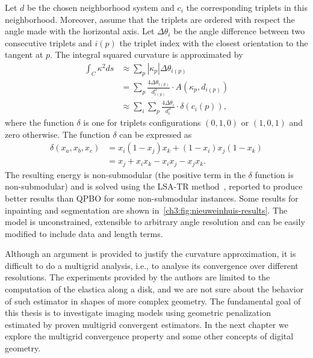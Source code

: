 Let $d$ be the chosen neighborhood system and $c_i$ the corresponding triplets in this neighborhood. Moreover, assume that the triplets are ordered with respect the angle made with the horizontal axis. Let $\Delta \theta_i$ be the angle difference between two consecutive triplets and $i(p)$ the triplet index with the closest orientation to the tangent at $p$. The integral squared curvature is approximated by 
\begin{align*}
	\int_{C}{\kappa ^2 ds} &\approx \sum_{p}{ |\kappa_{p}|\Delta \theta_{i(p)}} \\
	&= \sum_{p} \frac{4\Delta \theta _{i(p)}}{d^3_{i(p)}} \cdot A(\kappa_p,d_{i(p)}) \\
	&\approx \sum_{i}\sum_{p} \frac{4\Delta \theta _i}{d^3_i} \cdot \delta(c_i(p)),
\end{align*}
%
where the function $\delta$ is one for triplets configurations $(0,1,0)$ or $(1,0,1)$ and zero otherwise. The function $\delta$ can be expressed as
\begin{align*}
	\delta(x_a,x_b,x_c) &= x_i(1-x_j)x_k + (1-x_i)x_j(1-x_k) \\
	&= x_j + x_ix_k - x_ix_j - x_jx_k.
\end{align*}
%
The resulting energy is non-submodular (the positive term in the $\delta$ function is non-submodular) and is solved using the LSA-TR method~\cite{gorelick14local}, reported to produce better results than QPBO for some non-submodular instances. Some results for inpainting and segmentation are shown in~\cref{ch3:fig:nieuweinhuis-results}. The model is unconstrained, extensible to arbitrary angle resolution and can be easily modified to include data and length terms. 

Although an argument is provided to justify the curvature approximation, it is difficult to do a multigrid analysis, i.e., to analyse its convergence over different resolutions. The experiments provided by the authors are limited to the computation of the elastica along a disk, and we are not sure about the behavior of such estimator in shapes of more complex geometry. The fundamental goal of this thesis is to investigate imaging models using geometric penalization estimated by proven multigrid convergent estimators. In the next chapter we explore the multigrid convergence property and some other concepts of digital geometry.

